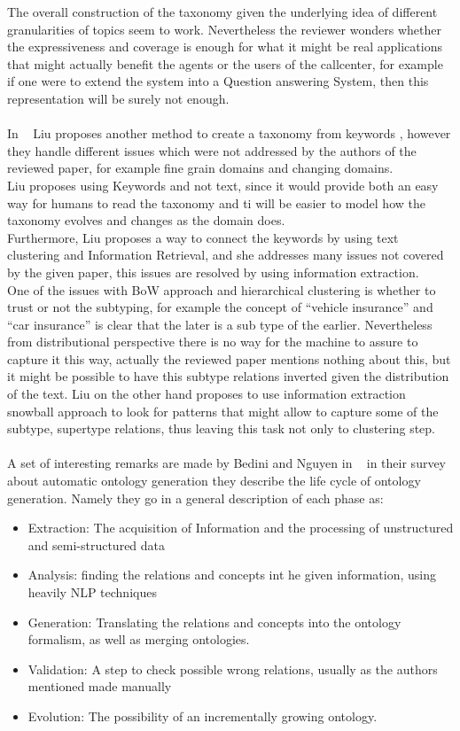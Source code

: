 \documentclass[4pt,a4paper,twocolumn]{article}
\begin{document}
The overall construction of the taxonomy given the underlying idea of different granularities of topics seem to work. Nevertheless the reviewer wonders whether the expressiveness and coverage is enough for what it might be real applications that might actually benefit the agents or the users of the callcenter, for example if one were to extend the system into a Question answering System, then this representation will be surely not enough.\\
\\
In ~\cite{DBLP:conf/kdd/LiuSLW12} Liu proposes another method to create a taxonomy from keywords , however they handle different issues which were not addressed by the authors of the reviewed paper, for example fine grain domains and changing domains.\\
Liu proposes using Keywords and not text, since it would provide both an easy way for humans to read the taxonomy and ti will be easier to model how the taxonomy evolves and changes as the domain does.\\
Furthermore, Liu proposes a way to connect the keywords by using text clustering and Information Retrieval, and she addresses many issues not covered by the given paper, this issues are resolved by using information extraction.\\
One of the issues with BoW approach and hierarchical clustering is whether to trust or not the subtyping, for example the concept of ``vehicle insurance'' and ``car insurance''  is clear that the later is a sub type of the earlier. Nevertheless from distributional perspective there is no way for the machine to assure to capture it this way, actually the reviewed paper mentions nothing about this, but it might be possible to have this subtype relations inverted given the distribution of the text. Liu on the other hand proposes to use information extraction snowball approach to look for patterns that might allow to capture some of the subtype, supertype relations, thus leaving this task not only to clustering step.\\
\\
A set of interesting remarks are made by  Bedini and Nguyen in ~\cite{artofontology} in their survey about automatic ontology generation they describe the life cycle of ontology generation. Namely they go in a general description of each phase as:
\begin{itemize}
	\item Extraction: The acquisition of Information and the processing of unstructured and semi-structured data
	\item Analysis: finding the relations and concepts int he given information, using heavily NLP techniques
	\item Generation: Translating the relations and concepts into the ontology formalism, as well as merging ontologies.
	\item Validation: A step to check possible wrong relations, usually as the authors mentioned made manually
	\item Evolution: The possibility of an incrementally growing ontology.
\end{itemize}
\end{document}
